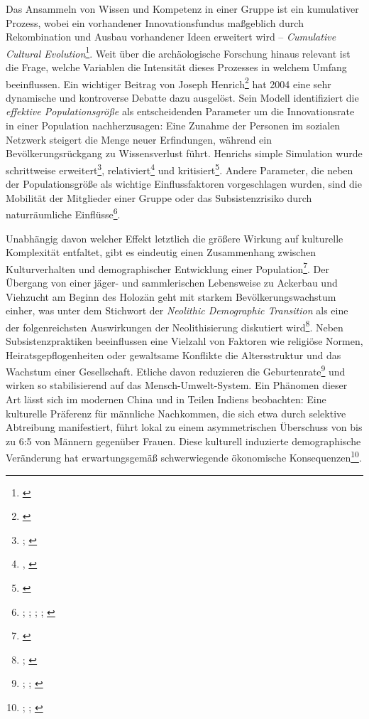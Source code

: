 \documentclass[openany,twoside,twocolumn]{book}
\let\rmarkdownfootnote\footnote%
\def\footnote{\protect\rmarkdownfootnote}
\begin{document}
Das Ansammeln von Wissen und Kompetenz in einer Gruppe ist ein
kumulativer Prozess, wobei ein vorhandener Innovationsfundus maßgeblich
durch Rekombination und Ausbau vorhandener Ideen erweitert wird --
\emph{Cumulative Cultural Evolution}\footnote{\textcite{mesoudi_what_2018}}.
Weit über die archäologische Forschung hinaus relevant ist die Frage,
welche Variablen die Intensität dieses Prozesses in welchem Umfang
beeinflussen. Ein wichtiger Beitrag von Joseph Henrich\footnote{\textcite{henrich_demography_2004}}
hat 2004 eine sehr dynamische und kontroverse Debatte dazu ausgelöst.
Sein Modell identifiziert die \emph{effektive Populationsgröße} als
entscheidenden Parameter um die Innovationsrate in einer Population
nachherzusagen: Eine Zunahme der Personen im sozialen Netzwerk steigert
die Menge neuer Erfindungen, während ein Bevölkerungsrückgang zu
Wissensverlust führt. Henrichs simple Simulation wurde schrittweise
erweitert\footnote{\textcite{KobayashiInnovativenesspopulationsize2012};
  \textcite{henrich_understanding_2016}}, relativiert\footnote{\textcite{collard_population_2013},
  \textcite{BaldiniRevisitingEffectPopulation2015}} und
kritisiert\footnote{\textcite{vaesen_population_2016}}. Andere
Parameter, die neben der Populationsgröße als wichtige Einflussfaktoren
vorgeschlagen wurden, sind die Mobilität der Mitglieder einer Gruppe
oder das Subsistenzrisiko durch naturräumliche Einflüsse\footnote{\textcite{collard_what_2011};
  \textcite{collard_risk_2013}; \textcite{buchanan_drivers_2016};
  \textcite{fitzhugh_risk_2001};
  \textcite{winterhalder_risk-senstive_1999}}.

Unabhängig davon welcher Effekt letztlich die größere Wirkung auf
kulturelle Komplexität entfaltet, gibt es eindeutig einen Zusammenhang
zwischen Kulturverhalten und demographischer Entwicklung einer
Population\footnote{\textcite{shennan_demography_2001}}. Der Übergang
von einer jäger- und sammlerischen Lebensweise zu Ackerbau und Viehzucht
am Beginn des Holozän geht mit starkem Bevölkerungswachstum einher, was
unter dem Stichwort der \emph{Neolithic Demographic Transition} als eine
der folgenreichsten Auswirkungen der Neolithisierung diskutiert
wird\footnote{\textcite{bocquetappel_paleoanthropological_2002};
  \textcite{gage_what_2009}}. Neben Subsistenzpraktiken beeinflussen
eine Vielzahl von Faktoren wie religiöse Normen, Heiratsgepflogenheiten
oder gewaltsame Konflikte die Altersstruktur und das Wachstum einer
Gesellschaft. Etliche davon reduzieren die Geburtenrate\footnote{\textcite{smith_cultural_1992};
  \textcite{colleran_cultural_2016}; \textcite{richerson_natural_1984}}
und wirken so stabilisierend auf das Mensch-Umwelt-System. Ein Phänomen
dieser Art lässt sich im modernen China und in Teilen Indiens
beobachten: Eine kulturelle Präferenz für männliche Nachkommen, die sich
etwa durch selektive Abtreibung manifestiert, führt lokal zu einem
asymmetrischen Überschuss von bis zu 6:5 von Männern gegenüber Frauen.
Diese kulturell induzierte demographische Veränderung hat
erwartungsgemäß schwerwiegende ökonomische Konsequenzen\footnote{\textcite{banister_shortage_2004};
  \textcite{li_cultural_2000}; \textcite{tuljapurkar_high_1995}}.
\end{document}
